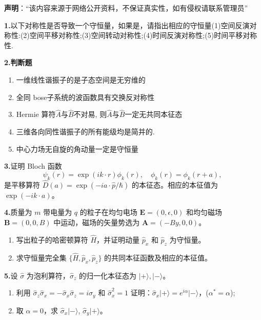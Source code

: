 
\textbf{声明}：“该内容来源于网络公开资料，不保证真实性，如有侵权请联系管理员”

\textbf{1.}以下对称性是否导致一个守恒量，如果是，请指出相应的守恒量(1)空间反演对称性:(2)空间平移对称性;(3)空间转动对称性;(4)时间反演对称性;(5)时间平移对称性.

\textbf{2.判断题}
\begin{enumerate}
\item 一维线性谐振子的是子态空间是无穷维的
\item 全同 bose子系统的波函数具有交换反对称性
\item Hermie 算符$\hat{A}$与$\hat{B}$不对易, 则$\hat{A}$与$\hat{B}$一定无共同本征态
\item 三维各向同性谐振子的所有能级均是简并的.
\item 中心力场无自旋的角动量一定是守恒量
\end{enumerate}

\textbf{3.}证明 Bloch 函数
$$\psi_k(r) = \exp(ik \cdot r)\phi_k(r), \quad \phi_k(r) = \phi_k(r + a),~$$
是平移算符 $\hat{D}(a) = \exp\left(-ia \cdot \hat{p}/\hbar\right)$ 的本征态。相应的本征值为 $\exp(-ik \cdot a)$。

\textbf{4.}质量为 $m$ 带电量为 $q$ 的粒子在均匀电场 $\mathbf{E} = (0, \epsilon, 0)$ 和均匀磁场 $\mathbf{B} = (0, 0, B)$ 中运动，磁场的矢量势选为 $\mathbf{A} = (-By, 0, 0)$。

\begin{enumerate}
    \item 写出粒子的哈密顿算符 $\hat{H}$，并证明动量 $\hat{p}_x$ 和 $\hat{p}_z$ 为守恒量。
    \item 求守恒量完全集 $\{\hat{H}, \hat{p}_x, \hat{p}_z\}$ 的共同本征函数及相应的本征值。
\end{enumerate}

\textbf{5.}设 $\hat{\sigma}$ 为泡利算符，$\hat{\sigma}_z$ 的归一化本征态为 $\lvert + \rangle, \lvert - \rangle$。

\begin{enumerate}
    \item  利用 $\hat{\sigma}_z \hat{\sigma}_x = -\hat{\sigma}_x \hat{\sigma}_z = i\hat{\sigma}_y$ 和 $\hat{\sigma}_x^2 = 1$ 证明：$\hat{\sigma}_x \lvert + \rangle = e^{i\alpha}\lvert - \rangle$，($\alpha^* = \alpha$);
    \item  取 $\alpha = 0$，求 $\hat{\sigma}_x \lvert - \rangle$, $\hat{\sigma}_y \lvert + \rangle$。
\end{enumerate}


